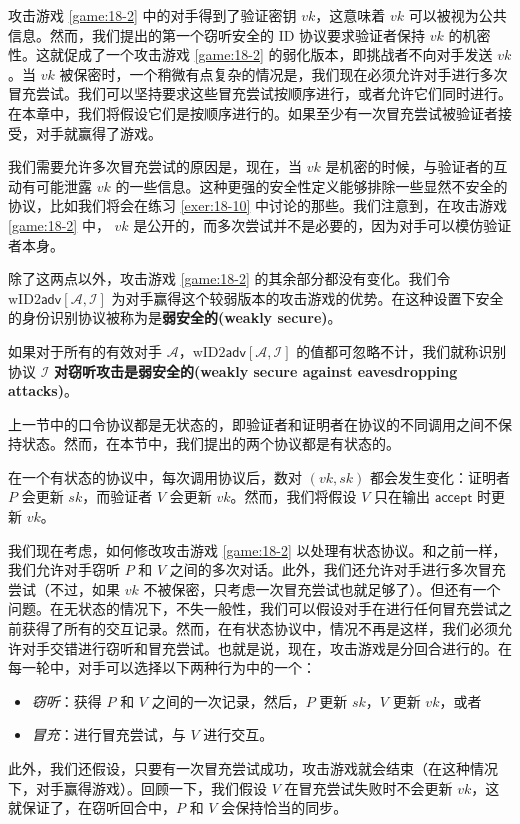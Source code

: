 \begin{snote}[保持 $vk$ 的机密性。]
攻击游戏 \ref{game:18-2} 中的对手得到了验证密钥 $vk$，这意味着 $vk$ 可以被视为公共信息。然而，我们提出的第一个窃听安全的 ID 协议要求验证者保持 $vk$ 的机密性。这就促成了一个攻击游戏 \ref{game:18-2} 的弱化版本，即挑战者不向对手发送 $vk$。当 $vk$ 被保密时，一个稍微有点复杂的情况是，我们现在必须允许对手进行多次冒充尝试。我们可以坚持要求这些冒充尝试按顺序进行，或者允许它们同时进行。在本章中，我们将假设它们是按顺序进行的。如果至少有一次冒充尝试被验证者接受，对手就赢得了游戏。

我们需要允许多次冒充尝试的原因是，现在，当 $vk$ 是机密的时候，与验证者的互动有可能泄露 $vk$ 的一些信息。这种更强的安全性定义能够排除一些显然不安全的协议，比如我们将会在练习 \ref{exer:18-10} 中讨论的那些。我们注意到，在攻击游戏 \ref{game:18-2} 中， $vk$ 是公开的，而多次尝试并不是必要的，因为对手可以模仿验证者本身。

除了这两点以外，攻击游戏 \ref{game:18-2} 的其余部分都没有变化。我们令 $\mathrm{wID2}\mathsf{adv}[\mathcal{A},\mathcal{I}]$ 为对手赢得这个较弱版本的攻击游戏的优势。在这种设置下安全的身份识别协议被称为是\textbf{弱安全的(weakly secure)}。
\end{snote}

\begin{definition}\label{def:18-7}
如果对于所有的有效对手 $\mathcal{A}$，$\mathrm{wID2}\mathsf{adv}[\mathcal{A},\mathcal{I}]$ 的值都可忽略不计，我们就称识别协议 $\mathcal{I}$ \textbf{对窃听攻击是弱安全的(weakly secure against eavesdropping attacks)}。
\end{definition}

\begin{snote}[有状态协议。]
上一节中的口令协议都是无状态的，即验证者和证明者在协议的不同调用之间不保持状态。然而，在本节中，我们提出的两个协议都是有状态的。

在一个有状态的协议中，每次调用协议后，数对 $(vk,sk)$ 都会发生变化：证明者 $P$ 会更新 $sk$，而验证者 $V$ 会更新 $vk$。然而，我们将假设 $V$ 只在输出 $\mathsf{accept}$ 时更新 $vk$。

我们现在考虑，如何修改攻击游戏 \ref{game:18-2} 以处理有状态协议。和之前一样，我们允许对手窃听 $P$ 和 $V$ 之间的多次对话。此外，我们还允许对手进行多次冒充尝试（不过，如果 $vk$ 不被保密，只考虑一次冒充尝试也就足够了）。但还有一个问题。在无状态的情况下，不失一般性，我们可以假设对手在进行任何冒充尝试之前获得了所有的交互记录。然而，在有状态协议中，情况不再是这样，我们必须允许对手交错进行窃听和冒充尝试。也就是说，现在，攻击游戏是分回合进行的。在每一轮中，对手可以选择以下两种行为中的一个：
\begin{itemize}
	\item \emph{窃听}：获得 $P$ 和 $V$ 之间的一次记录，然后，$P$ 更新 $sk$，$V$ 更新 $vk$，或者
	\item \emph{冒充}：进行冒充尝试，与 $V$ 进行交互。
\end{itemize}
此外，我们还假设，只要有一次冒充尝试成功，攻击游戏就会结束（在这种情况下，对手赢得游戏）。回顾一下，我们假设 $V$ 在冒充尝试失败时不会更新 $vk$，这就保证了，在窃听回合中，$P$ 和 $V$ 会保持恰当的同步。
\end{snote}

